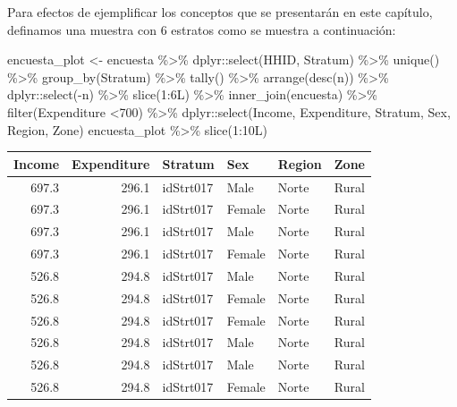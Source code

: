 \documentclass[
  12pt,
]{book}
\newenvironment{Shaded}{\begin{snugshade}}{\end{snugshade}}
\newcommand{\DecValTok}[1]{\textcolor[rgb]{0.00,0.00,0.81}{#1}}
\newcommand{\FunctionTok}[1]{\textcolor[rgb]{0.00,0.00,0.00}{#1}}
\newcommand{\NormalTok}[1]{#1}
\newcommand{\OtherTok}[1]{\textcolor[rgb]{0.56,0.35,0.01}{#1}}
\newcommand{\SpecialCharTok}[1]{\textcolor[rgb]{0.00,0.00,0.00}{#1}}
\begin{document}
Para efectos de ejemplificar los conceptos que se presentarán en este capítulo, definamos una muestra con 6 estratos como se muestra a continuación:

\begin{Shaded}
\begin{Highlighting}[]
\NormalTok{encuesta\_plot }\OtherTok{\textless{}{-}}\NormalTok{ encuesta }\SpecialCharTok{\%\textgreater{}\%}
\NormalTok{  dplyr}\SpecialCharTok{::}\FunctionTok{select}\NormalTok{(HHID, Stratum) }\SpecialCharTok{\%\textgreater{}\%} \FunctionTok{unique}\NormalTok{() }\SpecialCharTok{\%\textgreater{}\%}
  \FunctionTok{group\_by}\NormalTok{(Stratum)  }\SpecialCharTok{\%\textgreater{}\%} \FunctionTok{tally}\NormalTok{() }\SpecialCharTok{\%\textgreater{}\%} 
  \FunctionTok{arrange}\NormalTok{(}\FunctionTok{desc}\NormalTok{(n)) }\SpecialCharTok{\%\textgreater{}\%}\NormalTok{ dplyr}\SpecialCharTok{::}\FunctionTok{select}\NormalTok{(}\SpecialCharTok{{-}}\NormalTok{n) }\SpecialCharTok{\%\textgreater{}\%} 
  \FunctionTok{slice}\NormalTok{(}\DecValTok{1}\SpecialCharTok{:}\NormalTok{6L) }\SpecialCharTok{\%\textgreater{}\%}
  \FunctionTok{inner\_join}\NormalTok{(encuesta) }\SpecialCharTok{\%\textgreater{}\%} \FunctionTok{filter}\NormalTok{(Expenditure }\SpecialCharTok{\textless{}}\DecValTok{700}\NormalTok{) }\SpecialCharTok{\%\textgreater{}\%} 
\NormalTok{  dplyr}\SpecialCharTok{::}\FunctionTok{select}\NormalTok{(Income, Expenditure, Stratum, }
\NormalTok{         Sex, Region, Zone) }
\NormalTok{encuesta\_plot  }\SpecialCharTok{\%\textgreater{}\%} \FunctionTok{slice}\NormalTok{(}\DecValTok{1}\SpecialCharTok{:}\NormalTok{10L)}
\end{Highlighting}
\end{Shaded}

\begin{tabular}{r|r|l|l|l|l}
\hline
Income & Expenditure & Stratum & Sex & Region & Zone\\
\hline
697.3 & 296.1 & idStrt017 & Male & Norte & Rural\\
\hline
697.3 & 296.1 & idStrt017 & Female & Norte & Rural\\
\hline
697.3 & 296.1 & idStrt017 & Male & Norte & Rural\\
\hline
697.3 & 296.1 & idStrt017 & Female & Norte & Rural\\
\hline
526.8 & 294.8 & idStrt017 & Male & Norte & Rural\\
\hline
526.8 & 294.8 & idStrt017 & Female & Norte & Rural\\
\hline
526.8 & 294.8 & idStrt017 & Female & Norte & Rural\\
\hline
526.8 & 294.8 & idStrt017 & Male & Norte & Rural\\
\hline
526.8 & 294.8 & idStrt017 & Male & Norte & Rural\\
\hline
526.8 & 294.8 & idStrt017 & Female & Norte & Rural\\
\hline
\end{tabular}
\end{document}
